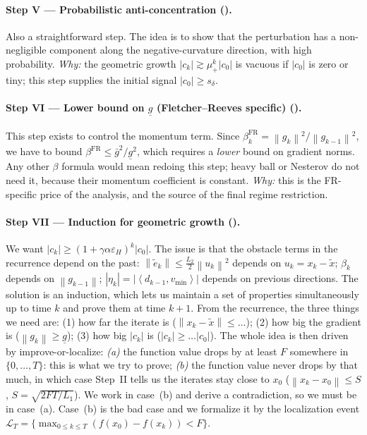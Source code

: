 \documentclass[11pt,a4paper]{article}
\theoremstyle{plain}
\theoremstyle{definition}
\newcommand{\norm}[1]{\left\|#1\right\|}
\newcommand{\inner}[2]{\left\langle #1,#2 \right\rangle}
\newcommand{\eps}{\varepsilon}
\newcommand{\epsH}{\eps_{H}}
\newcommand{\Lone}{L_{1}}
\newcommand{\Ltwo}{L_{2}}
\newcommand{\snap}{\tilde{x}}
\newcommand{\vmin}{v_{\min}}
\newcommand{\sdel}{s_{\delta}}
\newcommand{\glow}{\underline{g}}
\newcommand{\gup}{\bar g}
\begin{document}
\paragraph{Step V --- Probabilistic anti-concentration ().}
Also a straightforward step. The idea is to show that the perturbation has a
non-negligible component along the negative-curvature direction, with high
probability. \emph{Why:} the geometric growth $|c_{k}|\gtrsim\mu_{+}^{k}|c_{0}|$ is
vacuous if $|c_{0}|$ is zero or tiny; this step supplies the initial signal
$|c_{0}|\ge\sdel$.

\paragraph{Step VI --- Lower bound on $\glow$ (Fletcher--Reeves specific)
().}
This step exists to control the momentum term. Since
$\beta^{\mathrm{FR}}_{k}=\norm{g_{k}}^{2}/\norm{g_{k-1}}^{2}$, we have to bound
$\beta^{\mathrm{FR}}\le \gup^{2}/\glow^{2}$, which requires a \emph{lower} bound on
gradient norms. Any other $\beta$ formula would mean redoing this step; heavy ball or
Nesterov do not need it, because their momentum coefficient is constant.
\emph{Why:} this is the FR-specific price of the analysis, and the source of the
final regime restriction.

\paragraph{Step VII --- Induction for geometric growth ().}
We want $|c_{k}|\ge(1+\gamma\alpha\epsH)^{k}|c_{0}|$. The issue is that the obstacle
terms in the recurrence depend on the past:
$\norm{\tilde e_{k}}\le\tfrac{\Ltwo}{2}\norm{u_{k}}^{2}$ depends on
$u_{k}=x_{k}-\snap$; $\beta_{k}$ depends on $\norm{g_{k-1}}$;
$|\eta_{k}|=|\inner{d_{k-1}}{\vmin}|$ depends on previous directions.
The solution is an induction, which lets us maintain a set of properties
simultaneously up to time $k$ and prove them at time $k+1$. From the recurrence, the
three things we need are: (1) how far the iterate is
($\norm{x_{k}-\snap}\le\dots$); (2) how big the gradient is
($\norm{g_{k}}\ge\glow$); (3) how big $|c_{k}|$ is ($|c_{k}|\ge\dots|c_{0}|$).
The whole idea is then driven by improve-or-localize:
\emph{(a)} the function value drops by at least $F$ somewhere in $\{0,\dots,T\}$:
this is what we try to prove;
\emph{(b)} the function value never drops by that much, in which case Step~II tells
us the iterates stay close to $x_{0}$
($\norm{x_{k}-x_{0}}\le S$, $S=\sqrt{2FT/\Lone}$).
We work in case~(b) and derive a contradiction, so we must be in case~(a). Case~(b)
is the bad case and we formalize it by the localization event
$\mathcal{L}_{T}=\{\max_{0\le k\le T}(f(x_{0})-f(x_{k}))<F\}$.
\end{document}
